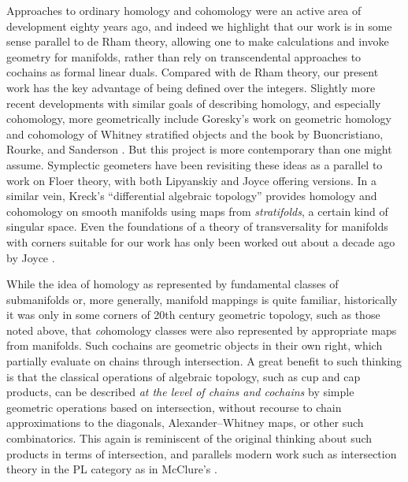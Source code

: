 Approaches to ordinary homology and cohomology were an active area of development eighty years ago, and indeed we highlight that our work is in some sense parallel to de Rham theory, allowing one to make calculations and invoke geometry for manifolds, rather than rely on transcendental approaches to cochains as formal linear duals.
Compared with de Rham theory, our present work has the key advantage of being defined over the integers.
Slightly more recent developments with similar goals of describing homology, and especially cohomology, more geometrically include Goresky's work on geometric homology and cohomology of Whitney stratified objects \cite{goresky1981stratified} and the book by Buoncristiano, Rourke, and Sanderson \cite{buoncristiano1976homology}.
But this project is more contemporary than one might assume.
Symplectic geometers have been revisiting these ideas as a parallel to work on Floer theory, with both Lipyanskiy \cite{Lipy14} and Joyce \cite{Joyc15} offering versions.
In a similar vein, Kreck's ``differential algebraic topology'' \cite{Krec10} provides homology and cohomology on smooth manifolds using maps from \textit{stratifolds}, a certain kind of singular space.
Even the foundations of a theory of transversality for manifolds with corners suitable for our work has only been worked out about a decade ago by Joyce \cite{Joy12}.

While the idea of homology as represented by fundamental classes of submanifolds or, more generally, manifold mappings is quite familiar, historically it was only in some corners of 20th century geometric topology, such as those noted above, that \textit{co}homology classes were also represented by appropriate maps from manifolds.
Such cochains are geometric objects in their own right, which partially evaluate on chains through intersection.
A great benefit to such thinking is that the classical operations of algebraic topology, such as cup and cap products, can be described \textit{at the level of chains and cochains} by simple geometric operations based on intersection, without recourse to chain approximations to the diagonals, Alexander--Whitney maps, or other such combinatorics.
This again is reminiscent of the original thinking about such products in terms of intersection, and parallels modern work such as intersection theory in the PL category as in McClure's \cite{McC06}.

